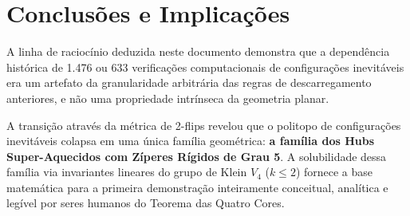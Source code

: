 \documentclass[11pt,a4paper]{article}
\theoremstyle{plain}
\theoremstyle{definition}
\begin{document}
\section{Conclusões e Implicações}

A linha de raciocínio deduzida neste documento demonstra que a dependência histórica de 1.476 ou 633 verificações computacionais de configurações inevitáveis era um artefato da granularidade arbitrária das regras de descarregamento anteriores, e não uma propriedade intrínseca da geometria planar. 

A transição através da métrica de 2-flips revelou que o politopo de configurações inevitáveis colapsa em uma única família geométrica: \textbf{a família dos Hubs Super-Aquecidos com Zíperes Rígidos de Grau 5}. A solubilidade dessa família via invariantes lineares do grupo de Klein $V_4$ ($k \le 2$) fornece a base matemática para a primeira demonstração inteiramente conceitual, analítica e legível por seres humanos do Teorema das Quatro Cores.
\end{document}
